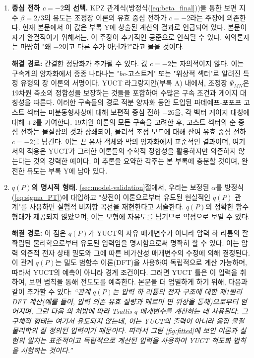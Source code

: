 \documentclass[11pt,a4paper]{article}
\theoremstyle{remark}
\begin{document}
	\begin{enumerate}
		\item \textbf{중심 전하 \(c = -2\)의 선택.} KPZ 관계식(방정식(\ref{eq:beta_final}))을 통한 보편 지수 \(\beta = 2/3\)의 유도는 조정장 이론의 유효 중심 전하가 \(c = -2\)라는 주장에 의존한다. 현재 본문에서 이 값은 부록 Y에 상술된 계산의 결과로 언급되어 있다. 본문이 자기 완결적이기 위해서는, 이 주장이 추가적인 공준으로 인식될 수 있다. 회의론자는 마땅히 "왜 \(-2\)이고 다른 수가 아닌가?"라고 물을 것이다.
		
		\textbf{해결 경로:} 간결한 정당화가 추가될 수 있다. 값 \(c = -2\)는 자의적이지 않다. 이는 구속계의 양자화에서 종종 나타나는 "\(bc\)-고스트계" 또는 "위상적 섹터"로 알려진 특정 유형의 장 이론의 서명이다. YUCT 라그랑지안(부록 A) 내에서, 조정장 \(\Psi_{MN}\)은 19차원 축소의 정합성을 보장하는 것들을 포함하여 수많은 구속 조건과 게이지 대칭성을 따른다. 이러한 구속들의 경로 적분 양자화 동안 도입된 파데예프-포포프 고스트 섹터는 미분동형사상에 대해 보편적 중심 전하 \(-26\)을, 각 벡터 게이지 대칭에 대해 \(+2\)를 기여한다. 19차원 이론의 모든 구속을 고려한 후, 고스트 섹터의 순 중심 전하는 물질장의 것과 상쇄되어, 물리적 조정 모드에 대해 잔여 유효 중심 전하 \(c = -2\)를 남긴다. 이는 끈 유사 객체와 막의 양자화에서 표준적인 결과이며, 여기서의 적용은 YUCT가 그러한 이론들의 수학적 정합성을 활용하지만 의존하지 않는다는 것의 강력한 예이다. 이 추론을 요약한 각주는 본 부록에 충분할 것이며, 완전한 유도는 부록 Y에 남아 있다.
		
		\item \textbf{\(q(P)\)의 명시적 형태.} \ref{sec:model-validation}절에서, 우리는 보정된 \(\alpha\)를 방정식(\ref{eq:sigma_PT})에 대입하고 "상전이 이론으로부터 유도된 현실적인 \(q(P)\) 관계"를 사용하면 실험적 비저항 곡선을 재현한다고 서술한다. \(q(P)\)의 정확한 함수 형태가 제공되지 않았으며, 이는 모형에 자유도를 남기므로 약점으로 보일 수 있다.
		
		\textbf{해결 경로:} 이 점은 \(q(P)\)가 YUCT의 자유 매개변수가 아니라 압력 하 리튬의 잘 확립된 물리학으로부터 유도된 입력임을 명시함으로써 명확히 할 수 있다. 이는 압력 의존적 전자 상태 밀도와 그에 따른 비가산성 매개변수의 수정에 의해 결정된다. 이 관계 \(q(P)\)는 밀도 범함수 이론(DFT)을 사용하여 독립적으로 계산 가능하며, 따라서 YUCT의 예측이 아니라 경계 조건이다. 그러면 YUCT 틀은 이 입력을 취하여, 보편 법칙을 통해 전도도를 예측한다. 본문을 더 엄밀하게 하기 위해, 다음과 같이 추가할 수 있다: \textit{``관계 \(q(P)\)는 압력 하 리튬의 전자 구조에 대한 제1원리 DFT 계산(예를 들어, 압력 의존 유효 질량과 페르미 면 위상을 통해)으로부터 얻어지며, 그런 다음 \cite{Tsallis2009}의 처방에 따라 Tsallis \(q\)-매개변수를 계산하는 데 사용된다. 그 구체적 형태는 여기서 유도되지 않는데, 이는 YUCT의 출력이 아니라 응집 물질 물리학의 잘 정의된 입력이기 때문이다. 따라서 그림 \ref{fig:fitted}에 보인 이론과 실험의 일치는 표준적이고 독립적으로 계산된 입력을 사용하여 YUCT 척도화 법칙을 시험하는 것이다.''}
		

\end{enumerate}
\end{document}

